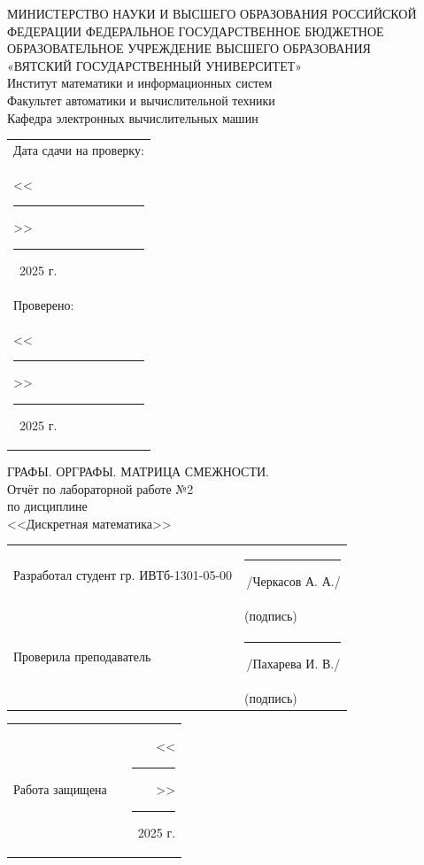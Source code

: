 \documentclass[oneside,a4paper,14pt]{extarticle}
\begin{document}
\newpage
\thispagestyle{empty}
\begin{center}
	МИНИСТЕРСТВО НАУКИ И ВЫСШЕГО ОБРАЗОВАНИЯ РОССИЙСКОЙ ФЕДЕРАЦИИ ФЕДЕРАЛЬНОЕ ГОСУДАРСТВЕННОЕ БЮДЖЕТНОЕ ОБРАЗОВАТЕЛЬНОЕ УЧРЕЖДЕНИЕ ВЫСШЕГО ОБРАЗОВАНИЯ\\
	«ВЯТСКИЙ ГОСУДАРСТВЕННЫЙ УНИВЕРСИТЕТ»\\
	Институт математики и информационных систем\\
	Факультет автоматики и вычислительной техники\\
	Кафедра электронных вычислительных машин
\end{center}
\vspace{10mm}

\hfill
\begin{tabular}{l}
  \footnotesize Дата сдачи на проверку: \\
  \footnotesize <<\rule[-1mm]{5mm}{0.10mm}\/>>\rule[-1mm]{20mm}{0.10mm}\ 2025 г.\\
  \footnotesize Проверено: \\
  \footnotesize <<\rule[-1mm]{5mm}{0.10mm}\/>>\rule[-1mm]{20mm}{0.10mm}\ 2025 г. \\
\end{tabular}
\vfill

\begin{center}
    ГРАФЫ. ОРГРАФЫ. МАТРИЦА СМЕЖНОСТИ.\\
	Отчёт по лабораторной работе №2\\
	по дисциплине\\
	<<Дискретная математика>>\\
\end{center}
\vspace{25mm}
\noindent
\begin{tabular}{ll}
	Разработал студент гр. ИВТб-1301-05-00 & \rule[-1mm]{30mm}{0.10mm}\,/Черкасов А. А./   \\
	                                       & \hspace{8mm}\footnotesize(подпись)            \\
	Проверила преподаватель                & \rule[-1mm]{30mm}{0.10mm}\,/Пахарева И. В./ \\
	                                       & \hspace{8mm}\footnotesize(подпись)            \\
\end{tabular}

\noindent
  \begin{tabular}{lp{58mm}r}
    Работа защищена &  & <<\rule[-1mm]{5mm}{0.10mm}\/>>\rule[-1mm]{30mm}{0.10mm}\ 2025 г.
  \end{tabular}
  \vfill
\end{document}

